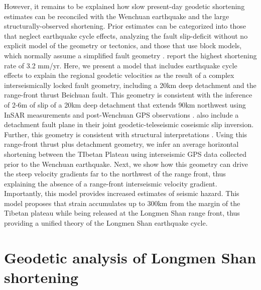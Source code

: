 \documentclass[12pt]{article}
\begin{document}
However, it remains to be explained how slow present-day geodetic shortening estimates can be reconciled with the Wenchuan earthquake and the large structurally-observed shortening. Prior estimates can be categorized into those that neglect earthquake cycle effects, analyzing the fault slip-deficit without no explicit model of the geometry or tectonics, \citep{chen00, shen05} and those that use block models, which normally assume a simplified fault geometry \citep{Meade07c, Loveless2011, Burchfiel2008a}. \citet{Loveless2011} report the highest shortening rate of 3.2 mm/yr.  Here, we present a model that includes earthquake cycle effects to explain the regional geodetic velocities as the result of a complex interseismically locked fault geometry, including a 20km deep detachment and the range-front thrust Beichuan fault.  This geometry is consistent with the inference of 2-6m of slip of a 20km deep detachment that extends 90km northwest using InSAR measurements and post-Wenchuan GPS observations \citep{Qi2011}. \citet{Fielding2013b} also include a detachment fault plane in their joint geodetic-teleseismic coseismic slip inversion. Further, this geometry is consistent with structural interpretations \citep{Hubbard2010, Li2010}. Using this range-front thrust plus detachment geometry, we infer an average horizontal shortening between the TIbetan Plateau using interseismic GPS data collected prior to the Wenchuan earthquake.  Next, we show how this geometry can drive the steep velocity gradients far to the northwest of the range front, thus explaining the absence of a range-front interseismic velocity gradient. Importantly, this model provides increased estimates of seismic hazard. This model proposes that strain accumulates up to 300km from the margin of the Tibetan plateau while being released at the Longmen Shan range front, thus providing a unified theory of the Longmen Shan earthquake cycle. 

\section{Geodetic analysis of Longmen Shan shortening}
\end{document}
